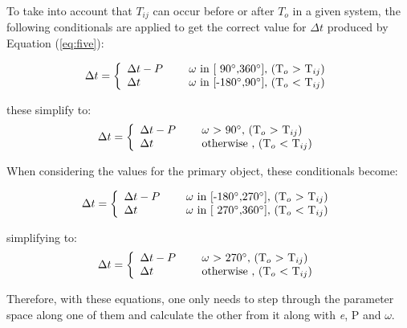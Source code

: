 \documentclass[12pt,preprint]{aastex}
\begin{document}
To take into account that $T_{ij}$ can occur before or after $T_{o}$ in a given system, the following conditionals are applied to get the correct value for $\Delta t$ produced by Equation (\ref{eq:five}):

\begin{equation}\label{eq:ToTcCorrections1a}
\Delta t = \left\{ \begin{array}{l l} \Delta t-P& \quad \text{ $\omega$ in [ 90$^{\circ}$,360$^{\circ}$], (T$_o$ $>$ T$_{ij}$)}\\  \Delta t& \quad \text{ $\omega$ in [-180$^{\circ}$,90$^{\circ}$], (T$_o$ $<$ T$_{ij}$)} \end{array} \right.
\end{equation}

these simplify to:
\begin{equation}\label{eq:ToTcCorrections1b}
\Delta t = \left\{ \begin{array}{l l} \Delta t-P& \quad \text{ $\omega$ $>$ 90$^{\circ}$, (T$_o$ $>$ T$_{ij}$)}\\  \Delta t& \quad \text{ otherwise , (T$_o$ $<$ T$_{ij}$)} \end{array} \right.
\end{equation}

When considering the values for the primary object, these conditionals become:

\begin{equation}\label{eq:ToTcCorrections2a}
\Delta t = \left\{ \begin{array}{l l} \Delta t-P& \quad \text{ $\omega$ in [-180$^{\circ}$,270$^{\circ}$], (T$_o$ $>$ T$_{ij}$)}\\  \Delta t& \quad \text{ $\omega$ in [ 270$^{\circ}$,360$^{\circ}$], (T$_o$ $<$ T$_{ij}$)} \end{array} \right.
\end{equation}

simplifying to:
\begin{equation}\label{eq:ToTcCorrections2b}
\Delta t = \left\{ \begin{array}{l l} \Delta t-P& \quad \text{ $\omega$ $>$ 270$^{\circ}$, (T$_o$ $>$ T$_{ij}$)}\\  \Delta t& \quad \text{ otherwise , (T$_o$ $<$ T$_{ij}$)} \end{array} \right.
\end{equation}

Therefore, with these equations, one only needs to step through the parameter space along one of them and calculate the other from it along with {\it e}, P and $\omega$.
\end{document}
